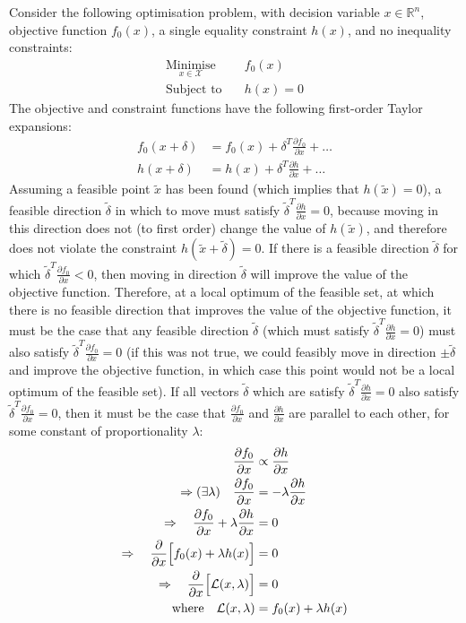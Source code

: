 Consider the following optimisation problem, with decision variable $x\in\mathbb{R}^n$, objective function $f_0(x)$, a single equality constraint $h(x)$, and no inequality constraints:
\begin{align*}
    \underset{x \in \mathcal{X}}{\text{Minimise}} \quad & f_0(x) \\
    \text{Subject to} \quad & h(x) = 0
\end{align*}
The objective and constraint functions have the following first-order Taylor expansions:
\begin{align*}
    f_0(x + \delta) &= f_0(x) + \delta^T\frac{\partial f_0}{\partial x} + \hdots \\
    h(x + \delta) &= h(x) + \delta^T\frac{\partial h}{\partial x} + \hdots
\end{align*}
Assuming a feasible point $\tilde{x}$ has been found (which implies that $h\left(\tilde{x}\right)=0$), a feasible direction $\tilde{\delta}$ in which to move must satisfy $\tilde{\delta}^T\frac{\partial h}{\partial x}=0$, because moving in this direction does not (to first order) change the value of $h\left(\tilde{x}\right)$, and therefore does not violate the constraint $h(\tilde{x}+\tilde{\delta})=0$. If there is a feasible direction $\tilde{\delta}$ for which $\tilde{\delta}^T\frac{\partial f_0}{\partial x}<0$, then moving in direction $\tilde{\delta}$ will improve the value of the objective function. Therefore, at a local optimum of the feasible set, at which there is no feasible direction that improves the value of the objective function, it must be the case that any feasible direction $\tilde{\delta}$ (which must satisfy $\tilde{\delta}^T\frac{\partial h}{\partial x}=0$) must also satisfy $\tilde{\delta}^T\frac{\partial f_0}{\partial x} = 0$ (if this was not true, we could feasibly move in direction $\pm\tilde{\delta}$ and improve the objective function, in which case this point would not be a local optimum of the feasible set). If all vectors $\tilde{\delta}$ which are satisfy $\tilde{\delta}^T\frac{\partial h}{\partial x}=0$ also satisfy $\tilde{\delta}^T\frac{\partial f_0}{\partial x}=0$, then it must be the case that $\frac{\partial f_0}{\partial x}$ and $\frac{\partial h}{\partial x}$ are parallel to each other, for some constant of proportionality $\lambda$:
\begin{align*}
    \frac{\partial f_0}{\partial x} &\propto \frac{\partial h}{\partial x} \\
    \Rightarrow (\exists \lambda)\quad\frac{\partial f_0}{\partial x} &= -\lambda \frac{\partial h}{\partial x} \\
    \Rightarrow\quad\frac{\partial f_0}{\partial x} + \lambda \frac{\partial h}{\partial x} &= 0 \\
    \Rightarrow\quad\frac{\partial}{\partial x}\Bigl[f_0(x) + \lambda h(x) \Bigr] &= 0 \\
    \Rightarrow\quad\frac{\partial}{\partial x}\Bigl[\mathcal{L}(x, \lambda) \Bigr] &= 0 \\
    \text{where} \quad \mathcal{L}(x, \lambda) &= f_0(x) + \lambda h(x)
\end{align*}
